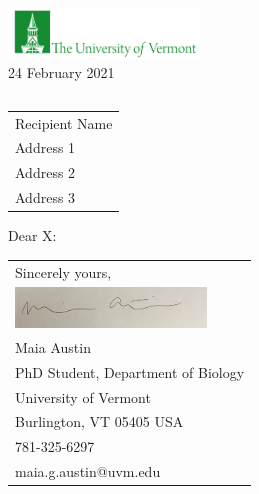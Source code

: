 \documentclass[10pt]{article}\usepackage[]{graphicx}\usepackage[]{color}
\begin{document}
\raggedright %
\includegraphics[scale=0.15,width=2in]{UVMLogoSolid7484.jpg}\\ 

 \hfill\hfill\hfill %
 24 February 2021\\[10pt]  %
 
\begin{tabular}{l@{}}
\end{tabular}

\begin{tabular}{@{}l}
Recipient Name\\
Address 1\\
Address 2\\
Address 3
\end{tabular}


Dear X:

\lipsum[1-2]




\begin{tabular}{@{}l}
Sincerely yours,\\
\includegraphics[scale=0.15,width=2in]{sig.jpg}\\
Maia Austin\\
PhD Student, Department of Biology\\
University of Vermont\\
Burlington, VT 05405 USA\\
781-325-6297\\
maia.g.austin@uvm.edu\\

\end{tabular}
\end{document}
